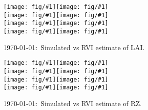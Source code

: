 \documentclass[a4paper]{article}
\newcommand{\figl}{\hspace*{-2cm}}
\newcommand{\figright}[1]{\texttt{[image: fig/\#1]}}
\newcommand{\fig}[1]{\figl\figright{#1}}
\newcommand{\MyID}{\today:~}
\begin{document}


\begin{figure}[htbp] 
  \fig{LAI}\figright{LAI-2010}\\
  \fig{LAI-2011}\figright{LAI-2012}\\
  \fig{LAI-2013}\figright{LAI-2014}\\
  \fig{LAI-2015}\figright{LAI-2016}
  \caption{\MyID{}Simulated vs RVI estimate of LAI.}
\end{figure}

\begin{figure}[htbp] 
  \fig{RZ}\figright{RZ-2010}\\
  \fig{RZ-2011}\figright{RZ-2012}\\
  \fig{RZ-2013}\figright{RZ-2014}\\
  \fig{RZ-2015}\figright{RZ-2016}
  \caption{\MyID{}Simulated vs RVI estimate of RZ.}
\end{figure}

\end{document}
